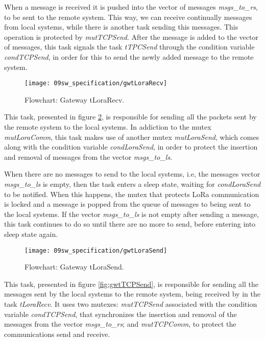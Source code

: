When a message is received it is pushed into the vector of messages \textit{msgs\_to\_rs}, to be sent to the remote system. This way, we can receive continually messages from local systems, while there is another task sending this messages. This operation is protected by \textit{mutTCPSend}. After the message is added to the vector of messages, this task signals the task \textit{tTPCSend} through the condition variable \textit{condTCPSend}, in order for this to send the newly added message to the remote system.

\begin{figure}[H]
	\centering
	\texttt{[image: 09sw\_specification/gwtLoraRecv]}
	\caption{Flowchart: Gateway tLoraRecv.}
	\label{fig:gwtLoraRecv}
\end{figure}

This task, presented in figure \ref{fig:gwtLoraSend}, is responsible for sending all the packets sent by the remote system to the local systems. In addiction to the mutex \textit{mutLoraComm}, this task makes use of another mutex \textit{mutLoraSend}, which comes along with the condition variable \textit{condLoraSend}, in order to protect the insertion and removal of messages from the vector \textit{msgs\_to\_ls}.

When there are no messages to send to the local systems, i.e, the messages vector \textit{msgs\_to\_ls} is empty, then the task enters a sleep state, waiting for \textit{condLoraSend} to be notified. When this happens, the mutex that protects LoRa communication is locked and a message is popped from the queue of messages to being sent to the local systems. If the vector \textit{msgs\_to\_ls} is not empty after sending a message, this task continues to do so until there are no more to send, before entering into sleep state again.

\begin{figure}[H]
	\centering
	\texttt{[image: 09sw\_specification/gwtLoraSend]}
	\caption{Flowchart: Gateway tLoraSend.}
	\label{fig:gwtLoraSend}
\end{figure}

This task, presented in figure \ref{fig:gwtTCPSend}, is responsible for sending all the messages sent by the local systems to the remote system, being received by in the task \textit{tLoraRecv}. It uses two mutexes: \textit{mutTCPSend} associated with the condition variable \textit{condTCPSend}, that synchronizes the insertion and removal of the messages from the vector \textit{msgs\_to\_rs}; and \textit{mutTCPComm}, to protect the communications send and receive.

